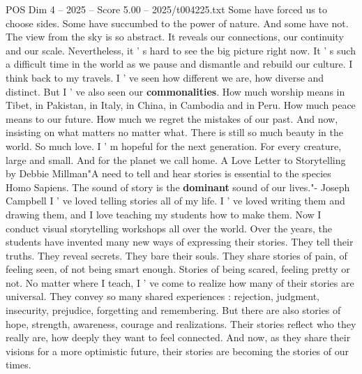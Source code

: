 \begin{textsample}{POS Dim 4 – 2025 – Score 5.00 – 2025/t004225.txt}
Some have forced us to choose sides.
Some have succumbed to the power of nature.
And some have not.
The view from the sky is so abstract.
It reveals our connections, our continuity and our scale.
Nevertheless, it ' s hard to see the big picture right now.
It ' s such a difficult time in the world as we pause and dismantle and rebuild our culture.
I think back to my travels.
I ' ve seen how different we are, how diverse and distinct.
But I ' ve also seen our \textbf{commonalities}.
How much worship means in Tibet, in Pakistan, in Italy, in China, in Cambodia and in Peru.
How much peace means to our future.
How much we regret the mistakes of our past.
And now, insisting on what matters no matter what.
There is still so much beauty in the world.
So much love.
I ' m hopeful for the next generation.
For every creature, large and small.
And for the planet we call home.
A Love Letter to Storytelling by Debbie Millman"A need to tell and hear stories is essential to the species Homo Sapiens.
The sound of story is the \textbf{dominant} sound of our lives."- Joseph Campbell I ' ve loved telling stories all of my life.
I ' ve loved writing them and drawing them, and I love teaching my students how to make them.
Now I conduct visual storytelling workshops all over the world.
Over the years, the students have invented many new ways of expressing their stories.
They tell their truths.
They reveal secrets.
They bare their souls.
They share stories of pain, of feeling seen, of not being smart enough.
Stories of being scared, feeling pretty or not.
No matter where I teach, I ' ve come to realize how many of their stories are universal.
They convey so many shared experiences : rejection, judgment, insecurity, prejudice, forgetting and remembering.
But there are also stories of hope, strength, awareness, courage and realizations.
Their stories reflect who they really are, how deeply they want to feel connected.
And now, as they share their visions for a more optimistic future, their stories are becoming the stories of our times.

\end{textsample}

